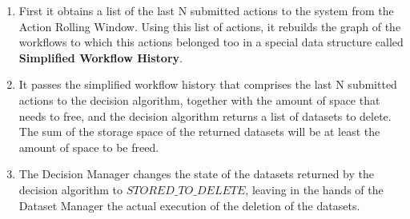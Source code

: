 \begin{enumerate}
\item First it obtains a list of the last N submitted actions to the system from the Action Rolling Window. Using this list of actions, it rebuilds the graph of the workflows to which this actions belonged too in a special data structure called \textbf{Simplified Workflow History}.
\item It passes the simplified workflow history that comprises the last N submitted actions to the decision algorithm, together with the amount of space that needs to free, and the decision algorithm returns a list of datasets to delete. The sum of the storage space of the returned datasets will be at least the amount of space to be freed.
\item The Decision Manager changes the state of the datasets returned by the decision algorithm to $STORED\_TO\_DELETE$, leaving in the hands of the Dataset Manager the actual execution of the deletion of the datasets.

\end{enumerate}

